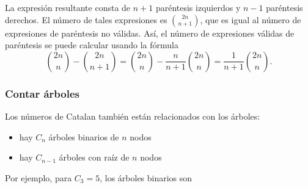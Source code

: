 La expresión resultante consta de $n+1$
paréntesis izquierdos y $n-1$ paréntesis derechos.
El número de tales expresiones es ${2n \choose n+1}$,
que es igual al número de expresiones de paréntesis
no válidas.
Así, el número de expresiones válidas de paréntesis
se puede calcular usando la fórmula
\[{2n \choose n}-{2n \choose n+1} = {2n \choose n} - \frac{n}{n+1} {2n \choose n} = \frac{1}{n+1} {2n \choose n}.\]

\subsubsection{Contar árboles}

Los números de Catalan también están relacionados con los árboles:

\begin{itemize}
\item hay $C_n$ árboles binarios de $n$ nodos
\item hay $C_{n-1}$ árboles con raíz de $n$ nodos
\end{itemize}
\noindent
Por ejemplo, para $C_3=5$, los árboles binarios son

